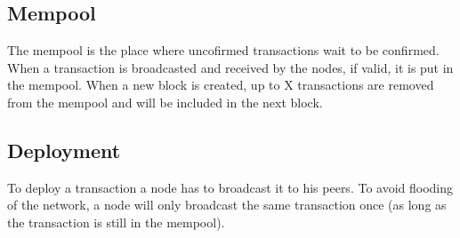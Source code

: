 \documentclass[a4paper]{article}
\begin{document}
\subsection{Mempool}

The mempool is the place where uncofirmed transactions
wait to be confirmed.
When a transaction is broadcasted and received by the nodes,
if valid, it is put in the mempool.
When a new block is created, up to X transactions are removed from the
mempool and will be included in the next block.

\subsection{Deployment}

To deploy a transaction a node has to broadcast it to his peers.
To avoid flooding of the network, a node will only broadcast
the same transaction once (as long as the transaction is still in the mempool).
\end{document}
